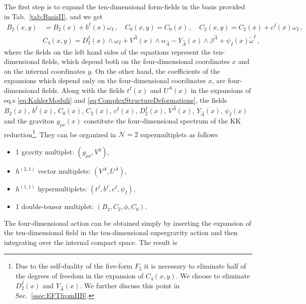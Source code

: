 \documentclass[12pt,a4paper]{book}
\begin{document}
The first step is to expand the ten-dimensional form-fields in the basis provided in Tab.~\ref{tab:BasisII}, and we get~\cite{grimm:2004uq}
\begin{align}
\label{eq:ExpansionII}
B_2(x,y) &\,= B_2(x) + b^I(x) \omega_I\,, \quad C_0(x,y) = C_0(x) \,, \quad C_2(x,y) = C_2(x) + c^I(x) \omega_I \,, \nonumber \\
&C_4(x,y) = D^I_2(x) \wedge \omega_I + V^{\hat{A}}(x) \wedge \alpha_{\hat{A}} - Y_{\hat{A}}(x) \wedge \beta^{\hat{A}} + \psi_I(x) \tilde{\omega}^I\,,
\end{align}
where the fields on the left hand sides of the equations represent the ten-dimensional fields, which depend both on the four-dimensional coordinates $x$ and on the internal coordinates $y$. On the other hand, the coefficients of the expansions which depend only on the four-dimensional coordinates $x$, are four-dimensional fields. Along with the fields $t^I(x)$ and $U^A(x)$ in the expansions of eq.s \eqref{eq:KahlerModuli} and \eqref{eq:ComplexStructureDeformations}, the fields $B_2(x)$, $b^I(x)$, $C_0(x)$, $C_2(x)$, $c^I(x)$, $D^I_2(x)$, $V^{\hat{A}}(x)$, $Y_{\hat{A}}(x)$, $\psi_I(x)$ and the graviton $g_{\mu\nu}(x)$ constitute the four-dimensional spectrum of the KK reduction\footnote{Due to the self-duality of the five-form $F_5$ it is necessary to eliminate half of the degrees of freedom in the expansion of $C_4(x,y)$. We choose to eliminate $D^I_2(x)$ and $Y_{\hat{A}}(x)$. We further discuss this point in Sec.~\ref{ssec:EFTfromIIB}.}. They can be organized in $\mathcal{N} = 2$ supermultiplets as follows
\begin{itemize}
\item 1 gravity multiplet: $(g_{\mu\nu}, V^0)$,
\item $h^{(2,1)}$ vector multiplets: $(V^A, U^A)$,
\item $h^{(1,1)}$ hypermultiplets: $(t^I, b^I, c^I, \psi_I)$,
\item 1 double-tensor multiplet: $(B_2, C_2, \phi, C_0)$.
\end{itemize}
The four-dimensional action can be obtained simply by inserting the expansion of the ten-dimensional field in the ten-dimensional supergravity action and then integrating over the internal compact space. The result is
\end{document}
